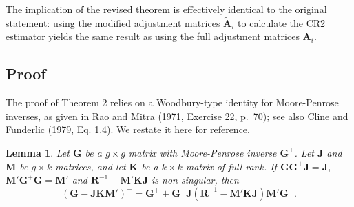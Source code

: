\documentclass[12pt]{article}
\newtheorem{lem}{Lemma}
\begin{document}
The implication of the revised theorem is effectively identical to the
original statement: using the modified adjustment matrices
\(\tilde{\mathbf{A}}_i\) to calculate the CR2 estimator yields the same
result as using the full adjustment matrices \(\mathbf{A}_i\).

\hypertarget{proof}{%
\subsection{Proof}\label{proof}}

The proof of Theorem 2 relies on a Woodbury-type identity for
Moore-Penrose inverses, as given in Rao and Mitra (1971, Exercise 22,
p.~70); see also Cline and Funderlic (1979, Eq. 1.4). We restate it here
for reference.

\begin{lem}
\label{lemma}
Let $\mathbf{G}$ be a $g \times g$ matrix with Moore-Penrose inverse $\mathbf{G}^+$. Let $\mathbf{J}$ and $\mathbf{M}$ be $g \times k$ matrices, and let $\mathbf{K}$ be a $k \times k$ matrix of full rank. If $\mathbf{G} \mathbf{G}^+ \mathbf{J} = \mathbf{J}$, $\mathbf{M}' \mathbf{G}^+ \mathbf{G} = \mathbf{M}'$ and $\mathbf{R}^{-1} - \mathbf{M}' \mathbf{K} \mathbf{J}$ is non-singular, then
\begin{equation}
\left(\mathbf{G} - \mathbf{J} \mathbf{K} \mathbf{M}'\right)^+ = \mathbf{G}^+ + \mathbf{G}^+ \mathbf{J}\left( \mathbf{R}^{-1} - \mathbf{M}' \mathbf{K} \mathbf{J}\right)\mathbf{M}'\mathbf{G}^+.
\end{equation}
\end{lem}
\end{document}

